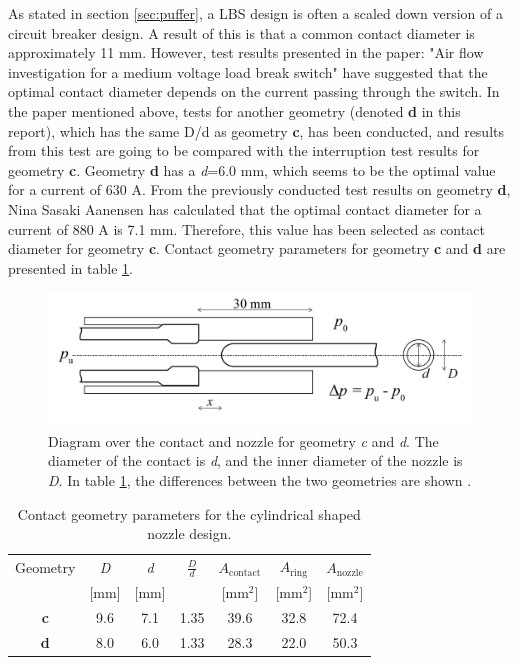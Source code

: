 \documentclass[10pt,b5paper,twoside]{article}
\begin{document}
As stated in section \ref{sec:puffer}, a LBS design is often a scaled down version of a circuit breaker design. A result of this is that a common contact diameter is approximately 11 mm. However, test results presented in the paper: "Air flow investigation for a medium voltage load break switch" \cite{bib:AFIMVLBA} have suggested that the optimal contact diameter depends on the current passing through the switch. In the paper mentioned above, tests for another geometry (denoted \textbf{d} in this report), which has the same D/d as geometry \textbf{c}, has been conducted, and results from this test are going to be compared with the interruption test results for geometry \textbf{c}. Geometry \textbf{d} has a \textit{d}=6.0 mm, which seems to be the optimal value for a current of 630 A. From the previously conducted test results on geometry \textbf{d}, Nina Sasaki Aanensen has calculated that the optimal contact diameter for a current of 880 A is 7.1 mm. Therefore, this value has been selected as contact diameter for geometry \textbf{c}. Contact geometry parameters for geometry \textbf{c} and \textbf{d} are presented in table \ref{tab:contGeoParaC}.

\begin{figure} [H]
\centering
\includegraphics[scale=0.3]{Bilder/Method/contactSetUp.png}
\caption{Diagram over the contact and nozzle for geometry \textit{c} and \textit{d}. The diameter of the contact is \textit{d}, and the inner diameter of the nozzle is \textit{D}. In table \ref{tab:contGeoParaC}, the differences between the two geometries are shown \cite{bib:AFIMVLBA}.} \label{fig:contactAndNozzleC}
\end{figure}

\begin{table}[H]
\center
\caption{Contact geometry parameters for the cylindrical shaped nozzle design.}
 \begin{tabular}{|c|c|c|c|c|c|c|}
\hline 
Geometry & \textit{D} & \textit{d}  & $\frac{D}{d}$ &  $A_\mathrm{{contact}}$ & $A_\mathrm{{ring}}$  & $A_\mathrm{{nozzle}}$ \\
  & [mm] &  [mm] &   &  [mm$^2$] &  [mm$^2$] &   [mm$^2$] \\
\hline 
\textbf{c} & 9.6 & 7.1 & 1.35 & 39.6 & 32.8 & 72.4 \\ 
\hline
\textbf{d} & 8.0 & 6.0 & 1.33 & 28.3 & 22.0 & 50.3 \\ 
\hline
\end{tabular} 
\label{tab:contGeoParaC}
\end{table}
\end{document}

